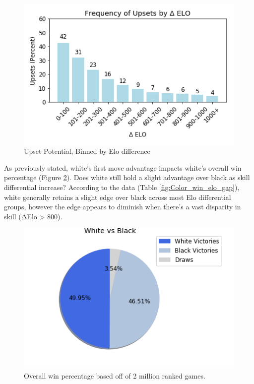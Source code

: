 \documentclass[reprint,
 amsmath,amssymb,nobibnotes,
 aps, floatfix]{revtex4-1}
\begin{document}
\begin{figure}
    \centering
    \includegraphics[scale=.5]{davis_image2.png}
    \caption{Upset Potential, Binned by Elo difference}
    \label{fig:upset_elo}
\end{figure}
As previously stated, white's first move advantage impacts white's overall win percentage (Figure \ref{fig:overall_wins}). Does white still hold a slight advantage over black as skill differential increase? According to the data (Table \ref{fig:Color_win_elo_gap}), white generally retains a slight edge over black across most Elo differential groups, however the edge appears to diminish when there’s a vast disparity in skill (ΔElo > 800).
\begin{figure}
    \centering
    \includegraphics[scale=.5]{davis_image3.png}
    \caption{Overall win percentage based off of 2 million ranked games.}
    \label{fig:overall_wins}
\end{figure}
\end{document}

